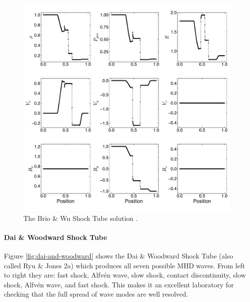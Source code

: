 \documentclass[modern]{aastex631}
\newcommand*{\img}[1]{%
    \raisebox{-.05\baselineskip}{%
        \texttt{[image: \#1]}%
    }%
}
\begin{document}
\begin{figure}[ht!]
    \includegraphics[width=\linewidth]{b-and-w.pdf}
    \caption{The Brio \& Wu Shock Tube solution \citep{brio_wu_1988}.
    \href{https://zenodo.org/records/10927223}{\img{zenodo-gradient-200.png}}}
    \label{fig:brio-and-wu}
\end{figure}

\paragraph{Dai \& Woodward Shock Tube}
Figure \ref{fig:dai-and-woodward} shows the Dai \& Woodward Shock Tube (also called Ryu \& Jones 2a) \citep{dai_woodward_1998, ryu_jones_1995} which produces all seven possible MHD waves. From left to right they are: fast shock, Alfvén wave, slow shock, contact discontinuity, slow shock, Alfvén wave, and fast shock. This makes it an excellent laboratory for checking that the full spread of wave modes are well resolved.
\end{document}
